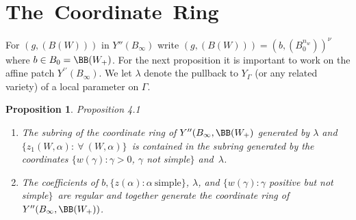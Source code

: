 \documentclass{memo-l}
\newtheorem{proposition}[theorem]{Proposition}
\theoremstyle{definition}
\theoremstyle{remark}
\numberwithin{section}{chapter}
\numberwithin{equation}{chapter}
\begin{document}
\section{The\ Coordinate\ Ring}

   For $(g,(B(W)))$ in $Y''(B_{{\infty}})$ write $(g,(B(W))) =
(b,(B_{0}^{n_w}))^\nu$  where $b \in B_{0}={\BB}(W_{+})$.
 For the next proposition it is important to work on the affine patch
$Y^{\prime\prime}(B_{{\infty}})$.  We let $\lambda$ denote the pullback
to $Y_\Gamma$ (or any related variety) of a local parameter on $\Gamma$.

\medpagebreak

\begin{proposition}{Proposition  4.1}
\begin{enumerate}[label={\alph*)}]
\item The subring of the coordinate ring of $Y^{\prime\prime}(B_\infty,\BB(W_+)$
generated by $\lambda$ and $\{z_{1}(W,{\alpha}): \ \forall\
(W,\alpha)\}$\ is contained in the subring generated by the
coordinates $\{w({\gamma}) : {\gamma} > 0$, ${\gamma}$ not simple$\}$
and\ ${\lambda}$.
\item The coefficients of $b, \{z({\alpha}):{\alpha}\ {\text{simple}}\}$,
${\lambda}$,
and $\{w({\gamma}):{\gamma}$ positive but not simple$\}$\ are regular and together generate
the coordinate ring of \hfil\break $Y''(B_{{\infty}},{\BB}(W_{+}))$.
\end{enumerate}
\end{proposition}
\end{document}
